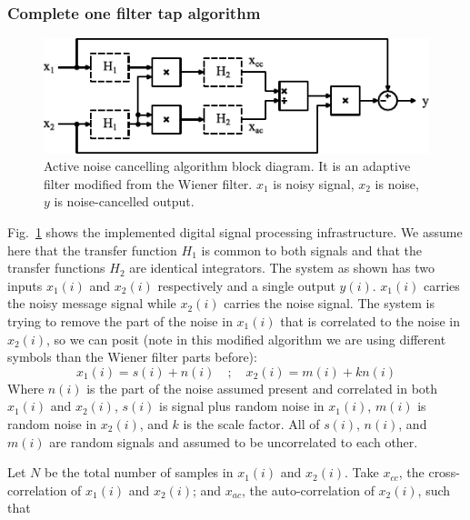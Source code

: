 \subsubsection{Complete one filter tap algorithm}

\begin{figure}[H]
\centerline{\includegraphics[width=1\linewidth]{4-ANC_Sys/DSP.pdf}}
\caption{Active noise cancelling algorithm block diagram.  It is an adaptive filter modified from the Wiener filter. $x_1$ is noisy signal, $x_2$ is noise, $y$ is noise-cancelled output.}
\label{fig_DSP}
\end{figure}

Fig.~\ref{fig_DSP} shows the implemented digital signal processing infrastructure.  We assume here that the transfer function $H_1$ is common to both signals and that the transfer functions $H_2$ are identical integrators.  The system as shown has two inputs $x_1(i)$ and $x_2(i)$ respectively and a single output $y(i)$.  $x_1(i)$ carries the noisy message signal while $x_2(i)$ carries the noise signal.  The system is trying to remove the part of the noise in $x_1(i)$ that is correlated to the noise in $x_2(i)$, so we can posit (note in this modified algorithm we are using different symbols than the Wiener filter parts before):
$$x_1(i)=s(i)+n(i) \quad;\quad x_2(i)=m(i)+kn(i)$$
Where $n(i)$ is the part of the noise assumed present and correlated in both $x_1(i)$ and $x_2(i)$, $s(i)$ is signal plus random noise in $x_1(i)$, $m(i)$ is random noise in $x_2(i)$, and $k$ is the scale factor.  All of $s(i)$, $n(i)$, and $m(i)$ are random signals and assumed to be uncorrelated to each other.

Let $N$ be the total number of samples in $x_1(i)$ and $x_2(i)$.  Take $x_{cc}$, the cross-correlation of $x_1(i)$ and $x_2(i)$; and $x_{ac}$, the auto-correlation of $x_2(i)$, such that

